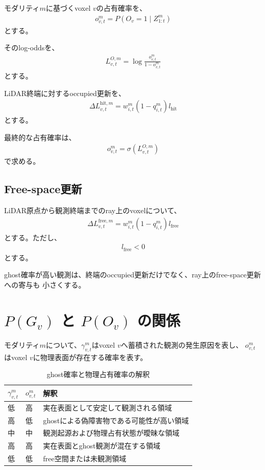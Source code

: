\documentclass[uplatex,a4paper,11pt]{jsarticle}
\begin{document}
モダリティ$m$に基づくvoxel $v$の占有確率を、
\begin{align}
  o_{v,t}^{m}
  =
  P
  \left(
    O_v=1
    \mid
    Z_{1:t}^{m}
  \right)
\end{align}
とする。

そのlog-oddsを、
\begin{align}
  L_{v,t}^{O,m}
  =
  \log
  \frac{
    o_{v,t}^{m}
  }{
    1-o_{v,t}^{m}
  }
\end{align}
とする。

LiDAR終端に対するoccupied更新を、
\begin{align}
  \Delta L_{v,t}^{\mathrm{hit},m}
  =
  w_{i,t}^{m}
  \left(
    1-q_{i,t}^{m}
  \right)
  l_{\mathrm{hit}}
\end{align}
とする。

最終的な占有確率は、
\begin{align}
  o_{v,t}^{m}
  =
  \sigma
  \left(
    L_{v,t}^{O,m}
  \right)
\end{align}
で求める。

\subsection{Free-space更新}

LiDAR原点から観測終端までのray上のvoxelについて、
\begin{align}
  \Delta L_{v,t}^{\mathrm{free},m}
  =
  w_{i,t}^{m}
  \left(
    1-q_{i,t}^{m}
  \right)
  l_{\mathrm{free}}
\end{align}
とする。ただし、
\begin{align}
  l_{\mathrm{free}}<0
\end{align}
とする。

ghost確率が高い観測は、終端のoccupied更新だけでなく、ray上のfree-space更新への寄与も
小さくする。

\section{\texorpdfstring{$P(G_v)$ と $P(O_v)$}{P(Gv) と P(Ov)} の関係}

モダリティ$m$について、$\gamma_{v,t}^{m}$はvoxel $v$へ蓄積された観測の発生原因を表し、
$o_{v,t}^{m}$はvoxel $v$に物理表面が存在する確率を表す。

\begin{table}[h]
  \centering
  \caption{ghost確率と物理占有確率の解釈}
  \begin{tabular}{lll}
    \toprule
    $\gamma_{v,t}^{m}$ & $o_{v,t}^{m}$ & 解釈 \\
    \midrule
    低 & 高 & 実在表面として安定して観測される領域 \\
    高 & 低 & ghostによる偽障害物である可能性が高い領域 \\
    中 & 中 & 観測起源および物理占有状態が曖昧な領域 \\
    高 & 高 & 実在表面とghost観測が混在する領域 \\
    低 & 低 & free空間または未観測領域 \\
    \bottomrule
  \end{tabular}
\end{table}
\end{document}
